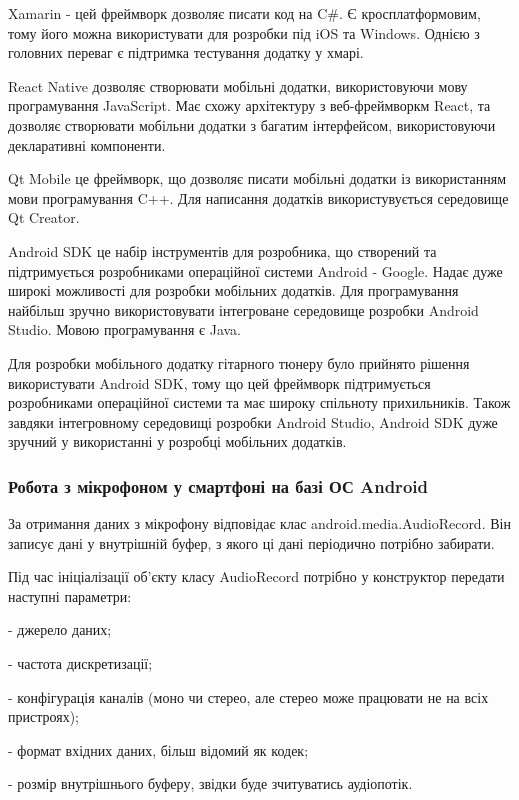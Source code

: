 Xamarin - цей фреймворк дозволяє писати код на C\#. Є кросплатформовим, тому його можна використувати для розробки під iOS та Windows. Однією з головних переваг є підтримка тестування додатку у хмарі. \cite{xamarin}

React Native дозволяє створювати мобільні додатки, використовуючи мову програмування JavaScript. Має схожу архітектуру з веб-фреймворкм React, та дозволяє створювати мобільни додатки з багатим інтерфейсом, використовуючи декларативні компоненти. \cite{react-native}

Qt Mobile це фреймворк, що дозволяє писати мобільні додатки із використанням мови програмування C++. Для написання додатків використувується середовище Qt Creator. \cite{qt-mobile}

Android SDK це набір інструментів для розробника, що створений та підтримується розробниками операційної системи Android - Google. Надає дуже широкі можливості для розробки мобільних додатків. Для програмування найбільш зручно використовувати інтегроване середовище розробки Android Studio. Мовою програмування є Java.
\cite{androiddevelopers} 

Для розробки мобільного додатку гітарного тюнеру було прийнято рішення використувати Android SDK, тому що цей фреймворк підтримується розробниками операційної системи та має широку спільноту прихильників. Також завдяки інтегровному середовищі розробки Android Studio, Android SDK дуже зручний у використанні у розробці мобільних додатків.

\subsubsection{Робота з мікрофоном у смартфоні на базі ОС Android}

За отримання даних з мікрофону відповідає клас android.media.AudioRecord. Він записує дані у внутрішній буфер, з якого ці дані періодично потрібно забирати.

Під час ініціалізації об'єкту класу AudioRecord потрібно у конструктор передати наступні параметри:

- джерело даних;

- частота дискретизації;

- конфігурація каналів (моно чи стерео, але стерео може працювати не на всіх 
пристроях);

- формат вхідних даних, більш відомий як кодек;

- розмір внутрішнього буферу, звідки буде зчитуватись аудіопотік.

